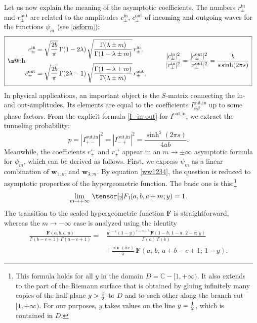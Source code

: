 \documentclass[11pt]{article}
\makeatletter
\newcommand*{\wideboxed}[1]{\setlength{\fboxsep}{1ex}%
  \fbox{\m@th$\displaystyle#1$}}
\newcommand{\hgf}{%
\,\tensor[_{2\kern-1.2pt}]{F}{_{\kern-0.8pt 1}}\kern-1.2pt}
\newcommand{\hgfs}{\mathbf{F}}
\newcommand{\CC}{\mathbb{C}}
\let\Re\relax\DeclareMathOperator{\Re}{Re}
\newcommand{\lar}{{\leftarrow}}
\newcommand{\rar}{{\rightarrow}}
\newcommand{\IN}{\text{in}}
\newcommand{\OUT}{\text{out}}
\newcommand{\ww}{\mathbf{w}}
\makeatother
\begin{document}
Let us now explain the meaning of the asymptotic coefficients. The numbers $r^{\IN}_{\pm}$ and $r^{\OUT}_{\pm}$ are related to the amplitudes $c^{\IN}_{\pm}$, $c^{\OUT}_{\pm}$ of incoming and outgoing waves for the functions $\psi_m$ (see \eqref{asform}):
\begin{equation} \label{asymco}
\wideboxed{
\begin{aligned}
c_{\pm}^{\IN}&=\sqrt{\frac{2b}{\pi}}\,\Gamma(1-2\lambda)\,
\sqrt{\frac{\Gamma(\lambda\pm m)}{\Gamma(1-\lambda\pm m)}}\,
r_{\pm}^{\IN},\\[3pt]
c_{\pm}^{\OUT}&=\sqrt{\frac{2b}{\pi}}\,\Gamma(2\lambda-1)\,
\sqrt{\frac{\Gamma(1-\lambda\pm m)}{\Gamma(\lambda\pm m)}}\,
r_{\pm}^{\OUT},
\end{aligned}\qquad\quad
\frac{|c_{\pm}^{\IN}|^2}{|r_{\pm}^{\IN}|^2}
=\frac{|c_{\pm}^{\OUT}|^2}{|r_{\pm}^{\OUT}|^2}
=\frac{b}{s\sinh(2\pi s)}
}
\end{equation}
In physical applications, an important object is the $S$-matrix connecting the in- and out-amplitudes. Its elements are equal to the coefficients $I^{\OUT,\IN}_{\alpha\beta}$ up to some phase factors. From the explicit formula \eqref{I_in-out} for $I^{\OUT,\IN}$, we extract the tunneling probability:
\begin{equation}
p=|I^{\OUT,\IN}_{+-}|^2=|I^{\OUT,\IN}_{-+}|^2=\frac{\sinh^2(2\pi s)}{4ab}.
\end{equation}
Meanwhile, the coefficients $r^{\lar}_{\pm}$ and $r^{\rar}_{\pm}$ appear in an $m\to\pm\infty$ asymptotic formula for $\psi_m$, which can be derived as follows. First, we express $\psi_m$ as a linear combination of $\ww_{1,m}$ and $\ww_{3,m}$. By equation \eqref{ww1234}, the question is reduced to asymptotic properties of the hypergeometric function. The basic one is this:\footnote{This formula holds for all $y$ in the domain $D=\CC-[1,+\infty)$. It also extends to the part of the Riemann surface that is obtained by gluing infinitely many copies of the half-plane $\Re y>\frac{1}{2}$ to $D$ and to each other along the branch cut $[1,+\infty)$. For our purposes, $y$ takes values on the line $\Re y=\frac{1}{2}$, which is contained in $D$.}
\begin{equation}
\lim_{m\to+\infty}\hgf(a,b,c+m;y)=1.
\end{equation}
The transition to the scaled hypergeometric function $\hgfs$ is straightforward, whereas the $m\to-\infty$ case is analyzed using the identity
\begin{equation}
\begin{aligned}
\frac{\hgfs(a,b,c;y)}{\Gamma(b-c+1)\,\Gamma(a-c+1)}
={}&\frac{y^{1-c}(1-y)^{c-a-b}\,
\hgfs(1-b,\,1-a,\,2-c;\,y)}{\Gamma(a)\,\Gamma(b)}\\
&+\frac{\sin(\pi c)}{\pi}\,\hgfs(a,\,b,\,a+b-c+1;\,1-y).
\end{aligned}
\end{equation}
\end{document}
